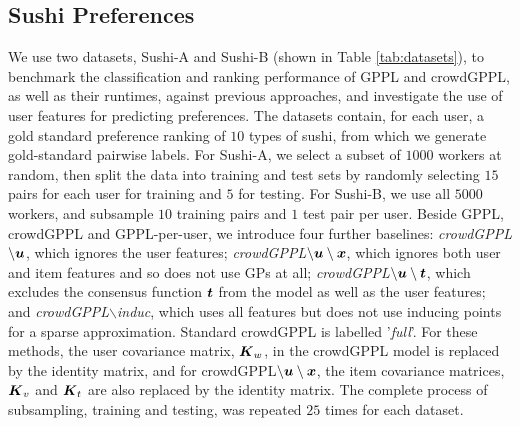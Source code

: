 \subsection{Sushi Preferences}\label{sec:sushi}

We use two datasets, Sushi-A and Sushi-B (shown in Table \ref{tab:datasets}),
to benchmark the classification and ranking performance of GPPL and crowdGPPL, 
as well as their runtimes, against previous approaches, 
and investigate the use of user features for predicting preferences.
The datasets contain, for each user, a gold standard preference ranking 
of $10$ types of sushi,
from which we generate gold-standard pairwise labels. 
For Sushi-A, we select a subset of $1000$ workers at random, then 
split the data into training and test sets by randomly
selecting $15$ pairs for each user for training and $5$ for testing. 
For Sushi-B, we use all $5000$ workers, and subsample $10$ training pairs and $1$ test pair per user.
Beside GPPL, crowdGPPL and GPPL-per-user, we 
introduce four further baselines: 
\emph{crowdGPPL$\mathbf{\setminus \boldsymbol u}$}, which ignores the user features;
 \emph{crowdGPPL$\mathbf{\setminus \boldsymbol u \setminus \boldsymbol x}$}, which ignores both user and item features and so does not use GPs at all;
 \emph{crowdGPPL$\mathbf{\setminus \boldsymbol u \setminus \boldsymbol t}$}, which 
excludes the consensus function $\boldsymbol t$ from the model as well as the user
features;
and  \emph{crowdGPPL$\backslash$induc}, which uses all features but does 
not use inducing points for a sparse approximation.
Standard crowdGPPL is labelled '\emph{full}'.
For these methods, the user covariance matrix, $\boldsymbol K_w$, in the crowdGPPL model is replaced by the identity matrix, and for crowdGPPL$\mathbf{\setminus \boldsymbol u \setminus \boldsymbol x}$, the item covariance matrices, $\boldsymbol K_v$ and $\boldsymbol K_t$ are also replaced by the identity matrix.
The complete process of subsampling, training and testing, was repeated $25$ times
for each dataset.

